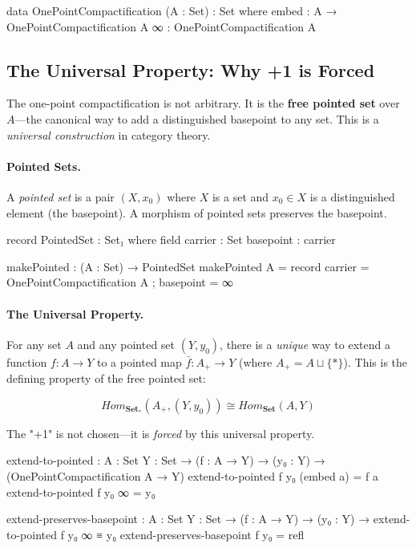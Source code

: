 \documentclass[11pt,a4paper]{book}
\def\text#1{#1}%
\begin{document}
\begin{code}
data OnePointCompactification (A : Set) : Set where
  embed : A → OnePointCompactification A
  ∞     : OnePointCompactification A

\end{code}

\subsection{The Universal Property: Why +1 is Forced}

The one-point compactification is not arbitrary. It is the \textbf{free pointed set} 
over $A$---the canonical way to add a distinguished basepoint to any set. This is a 
\emph{universal construction} in category theory.

\paragraph{Pointed Sets.}
A \emph{pointed set} is a pair $(X, x_0)$ where $X$ is a set and $x_0 \in X$ is a 
distinguished element (the basepoint). A morphism of pointed sets preserves the basepoint.

\begin{code}
record PointedSet : Set₁ where
  field
    carrier   : Set
    basepoint : carrier

makePointed : (A : Set) → PointedSet
makePointed A = record { carrier = OnePointCompactification A ; basepoint = ∞ }
\end{code}

\paragraph{The Universal Property.}
For any set $A$ and any pointed set $(Y, y_0)$, there is a \emph{unique} way to extend 
a function $f : A \to Y$ to a pointed map $\bar{f} : A_+ \to Y$ (where $A_+ = A \sqcup \{*\}$).
This is the defining property of the free pointed set:

\[
\text{Hom}_{\mathbf{Set}_*}(A_+, (Y, y_0)) \cong \text{Hom}_{\mathbf{Set}}(A, Y)
\]

The "+1" is not chosen---it is \emph{forced} by this universal property.

\begin{code}
extend-to-pointed : {A : Set} {Y : Set} → (f : A → Y) → (y₀ : Y) 
                  → (OnePointCompactification A → Y)
extend-to-pointed f y₀ (embed a) = f a
extend-to-pointed f y₀ ∞         = y₀

extend-preserves-basepoint : {A : Set} {Y : Set} → (f : A → Y) → (y₀ : Y) 
                           → extend-to-pointed f y₀ ∞ ≡ y₀
extend-preserves-basepoint f y₀ = refl
\end{code}
\end{document}
